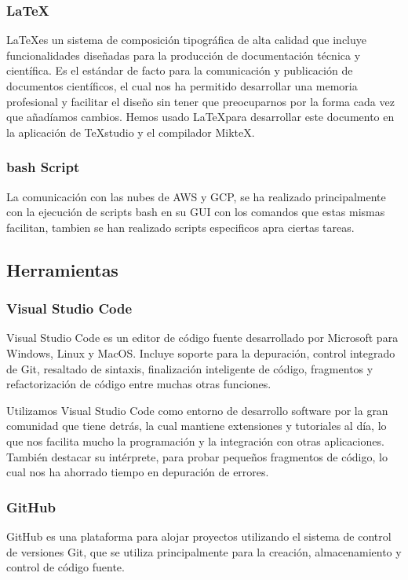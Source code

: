 \subsubsection*{\LaTeX} \label{latexDef}
\LaTeX\space es un sistema de composición tipográfica de alta calidad que incluye funcionalidades diseñadas para la producción de documentación técnica y científica. Es el estándar de facto para la comunicación y publicación de documentos científicos, el cual nos ha permitido desarrollar una memoria profesional y facilitar el diseño sin tener que preocuparnos por la forma cada vez que añadíamos cambios.       
Hemos usado \LaTeX\space para desarrollar este documento en la aplicación de TeXstudio y el compilador MikteX.

\subsubsection*{bash Script}
La comunicación con las nubes de AWS y GCP, se ha realizado principalmente con la ejecución de scripts bash en su GUI con los comandos que estas mismas facilitan, tambien se han realizado scripts especificos apra ciertas tareas.

\subsection{Herramientas} 

\subsubsection*{Visual Studio Code}
Visual Studio Code es un editor de código fuente desarrollado por Microsoft para Windows, Linux y MacOS. Incluye soporte para la depuración, control integrado de Git, resaltado de sintaxis, finalización inteligente de código, fragmentos y refactorización de código entre muchas otras funciones. 

Utilizamos Visual Studio Code como entorno de desarrollo software por la gran comunidad que tiene detrás, la cual mantiene extensiones y tutoriales al día, lo que nos facilita mucho la programación y la integración con otras aplicaciones. También destacar su intérprete, para probar pequeños fragmentos de código, lo cual nos ha ahorrado tiempo en depuración de errores.

\subsubsection*{GitHub}
GitHub es una plataforma para alojar proyectos utilizando el sistema de control de versiones Git, que se utiliza principalmente para la creación, almacenamiento y control de código fuente.  

